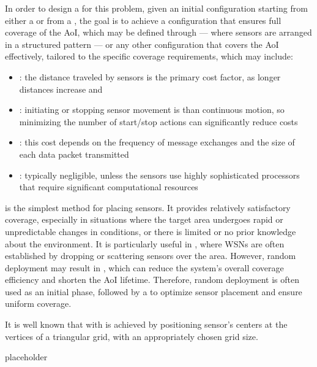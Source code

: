 \documentclass[a4paper, 12pt]{report}
\begin{document}
    In order to design a  for this problem, given an initial configuration starting from either a  or from a , the goal is to achieve a configuration that ensures full coverage of the AoI, which may be defined through  --- where sensors are arranged in a structured pattern --- or any other configuration that covers the AoI effectively, tailored to the specific coverage requirements, which may include:

    \begin{itemize}
        \item {}: the distance traveled by sensors is the primary cost factor, as longer distances increase  and 
        \item {}: initiating or stopping sensor movement is  than continuous motion, so minimizing the number of start/stop actions can significantly reduce costs
        \item {}: this cost depends on the frequency of message exchanges and the size of each data packet transmitted
        \item {}: typically negligible, unless the sensors use highly sophisticated processors that require significant computational resources
    \end{itemize}

     is the simplest method for placing sensors. It provides relatively satisfactory coverage, especially in situations where the target area undergoes rapid or unpredictable changes in conditions, or there is limited or no prior knowledge about the environment. It is particularly useful in , where WSNs are often established by dropping or scattering sensors over the area. However, random deployment may result in , which can reduce the system's overall coverage efficiency and shorten the AoI lifetime. Therefore, random deployment is often used as an initial phase, followed by a  to optimize sensor placement and ensure uniform coverage.

    It is well known that  with  is achieved by positioning sensor's centers at the vertices of a triangular grid, with an appropriately chosen grid size.

    placeholder 
\end{document}
